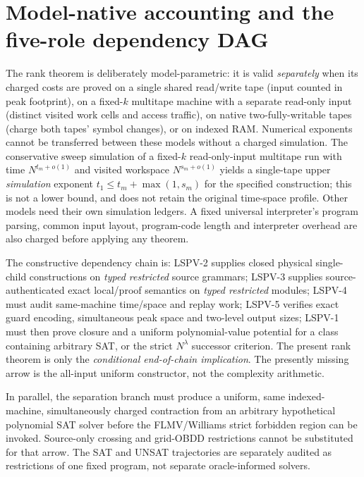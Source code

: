 \documentclass[11pt]{article}
\begin{document}
\section{Model-native accounting and the five-role dependency DAG}
\noindent The rank theorem is deliberately model-parametric: it is valid \emph{separately} when its charged costs are proved on a single shared read/write tape (input counted in peak footprint), on a fixed-$k$ multitape machine with a separate read-only input (distinct visited work cells and access traffic), on native two-fully-writable tapes (charge both tapes' symbol changes), or on indexed RAM. Numerical exponents cannot be transferred between these models without a charged simulation. The conservative sweep simulation of a fixed-$k$ read-only-input multitape run with time $N^{t_m+o(1)}$ and visited workspace $N^{s_m+o(1)}$ yields a single-tape upper \emph{simulation} exponent $t_1\le t_m+\max(1,s_m)$ for the specified construction; this is not a lower bound, and does not retain the original time-space profile. Other models need their own simulation ledgers. A fixed universal interpreter's program parsing, common input layout, program-code length and interpreter overhead are also charged before applying any theorem.

\noindent The constructive dependency chain is: LSPV-2 supplies closed physical single-child constructions on \emph{typed restricted} source grammars; LSPV-3 supplies source-authenticated exact local/proof semantics on \emph{typed restricted} modules; LSPV-4 must audit same-machine time/space and replay work; LSPV-5 verifies exact guard encoding, simultaneous peak space and two-level output sizes; LSPV-1 must then prove closure and a uniform polynomial-value potential for a class containing arbitrary SAT, or the strict $N^\lambda$ successor criterion. The present rank theorem is only the \emph{conditional end-of-chain implication}. The presently missing arrow is the all-input uniform constructor, not the complexity arithmetic.

\noindent In parallel, the separation branch must produce a uniform, same indexed-machine, simultaneously charged contraction from an arbitrary hypothetical polynomial SAT solver before the FLMV/Williams strict forbidden region can be invoked. Source-only crossing and grid-OBDD restrictions cannot be substituted for that arrow. The SAT and UNSAT trajectories are separately audited as restrictions of one fixed program, not separate oracle-informed solvers.
\end{document}
